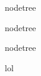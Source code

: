 \documentclass{article}
\begin{document}
\begin{nodetreeembed}
nodetree
\end{nodetreeembed}

\begin{nodetreeembed}
nodetree
\end{nodetreeembed}

\begin{nodetreeembed}
nodetree
\end{nodetreeembed}

lol
\end{document}

